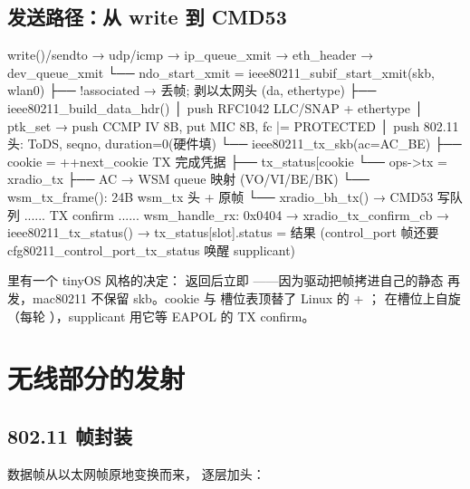 \subsection{发送路径：从 write 到 CMD53}

\begin{txtcode}
write()/sendto → udp/icmp → ip_queue_xmit → eth_header → dev_queue_xmit
└── ndo_start_xmit = ieee80211_subif_start_xmit(skb, wlan0)
      ├── !associated → 丢帧; 剥以太网头 (da, ethertype)
      ├── ieee80211_build_data_hdr()
      │     push RFC1042 LLC/SNAP + ethertype
      │     ptk_set → push CCMP IV 8B, put MIC 8B, fc |= PROTECTED
      │     push 802.11 头: ToDS, seqno, duration=0(硬件填)
      └── ieee80211_tx_skb(ac=AC_BE)
            ├── cookie = ++next_cookie          TX 完成凭据
            ├── tx_status[cookie %
            └── ops->tx = xradio_tx
                  ├── AC → WSM queue 映射 (VO/VI/BE/BK)
                  └── wsm_tx_frame(): 24B wsm_tx 头 + 原帧
                        └── xradio_bh_tx() → CMD53 写队列
                                        ...... TX confirm ......
wsm_handle_rx: 0x0404 → xradio_tx_confirm_cb → ieee80211_tx_status()
            → tx_status[slot].status = 结果 (control_port 帧还要
              cfg80211_control_port_tx_status 唤醒 supplicant)
\end{txtcode}

 里有一个 tinyOS 风格的决定： 返回后立即
——因为驱动把帧拷进自己的静态  再发，mac80211
不保留 skb。cookie 与  槽位表顶替了 Linux 的
 + ；
在槽位上自旋（每轮 ），supplicant 用它等 EAPOL 的 TX confirm。

\section{无线部分的发射}

\subsection{802.11 帧封装}

数据帧从以太网帧原地变换而来， 逐层加头：

